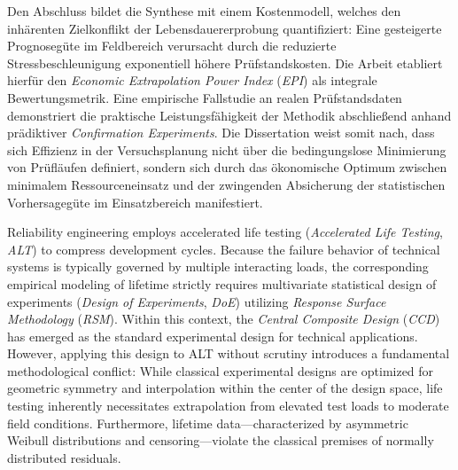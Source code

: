 \documentclass[
 print,%
english, ngerman,%
smallfont, %
twoside, %
toc=bib,
BCOR=6mm, %
]{isw_smb_diss} %
\numberwithin{equation}{chapter} %
\begin{document}
Den Abschluss bildet die Synthese mit einem Kostenmodell, welches den inhärenten Zielkonflikt der Lebensdauererprobung quantifiziert: Eine gesteigerte Prognosegüte im Feldbereich verursacht durch die reduzierte Stressbeschleunigung exponentiell höhere Prüfstandskosten. Die Arbeit etabliert hierfür den \textit{Economic Extrapolation Power Index} (\textit{EPI}) als integrale Bewertungsmetrik. Eine empirische Fallstudie an realen Prüfstandsdaten demonstriert die praktische Leistungsfähigkeit der Methodik abschließend anhand prädiktiver \textit{Confirmation Experiments}.
Die Dissertation weist somit nach, dass sich Effizienz in der Versuchsplanung nicht über die bedingungslose Minimierung von Prüfläufen definiert, sondern sich durch das ökonomische Optimum zwischen minimalem Ressourceneinsatz und der zwingenden Absicherung der statistischen Vorhersagegüte im Einsatzbereich manifestiert.

\clearpage

Reliability engineering employs accelerated life testing (\textit{Accelerated Life Testing}, \textit{ALT}) to compress development cycles. Because the failure behavior of technical systems is typically governed by multiple interacting loads, the corresponding empirical modeling of lifetime strictly requires multivariate statistical design of experiments (\textit{Design of Experiments}, \textit{DoE}) utilizing \textit{Response Surface Methodology} (\textit{RSM}). Within this context, the \textit{Central Composite Design} (\textit{CCD}) has emerged as the standard experimental design for technical applications. However, applying this design to ALT without scrutiny introduces a fundamental methodological conflict: While classical experimental designs are optimized for geometric symmetry and interpolation within the center of the design space, life testing inherently necessitates extrapolation from elevated test loads to moderate field conditions. Furthermore, lifetime data—characterized by asymmetric Weibull distributions and censoring—violate the classical premises of normally distributed residuals.
\end{document}
